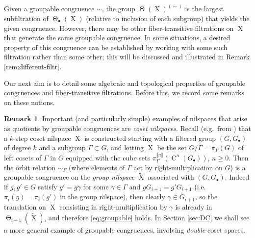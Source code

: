 \documentclass[a4paper,12pt,reqno]{amsart}
\theoremstyle{definition}
\newtheorem{remark}[theorem]{Remark}
\newcommand*{\db}[1]{\llbracket #1\rrbracket}
\newcommand{\wt}{\widetilde}
\DeclareMathOperator{\tran}{\Theta}
\DeclareMathOperator{\ns}{X}
\DeclareMathOperator{\cu}{C}
\begin{document}
Given a groupable congruence $\sim$, the group $\tran(\ns)^{(\sim)}$ is the largest subfiltration of $\tran_\bullet(\ns)$  (relative to inclusion of each subgroup) that yields the given congruence. However, there may be other fiber-transitive filtrations on $\ns$ that generate the same groupable congruence. In some situations, a desired property of this congruence can be established by working with some such filtration rather than some other; this will be discussed and illustrated in Remark \ref{rem:different-filtr}.

Our next aim is to detail some algebraic and topological properties of groupable congruences and fiber-transitive filtrations. Before this, we record some remarks on these notions.

\begin{remark}\label{rem:cosnilex}
Important (and particularly simple) examples of nilspaces that arise as quotients by groupable congruences are \emph{coset nilspaces}. Recall (e.g.\ from  \cite[Proposition 2.3.1]{Cand:Notes1}) that a $k$-step coset nilspace $\ns$ is constructed starting with a filtered group $(G,G_\bullet)$ of degree $k$ and a subgroup $\Gamma\subset G$, and letting $\ns$ be the set $G/\Gamma = \pi_\Gamma(G)$ of left cosets of $\Gamma$ in $G$ equipped with the cube sets $\pi_\Gamma^{\db{n}}(\cu^n(G_\bullet))$, $n\geq 0$. Then the orbit relation $\sim_\Gamma$ (where elements of $\Gamma$ act by right-multiplication on $G$) is a groupable congruence on the \emph{group nilspace}  $\wt{\ns}$ associated with $(G,G_\bullet)$. Indeed if $g,g'\in G$ satisfy $g'= g\gamma$ for some $\gamma\in \Gamma$ and $g G_{i+1} = g' G_{i+1}$ (i.e.\ $\pi_i(g)=\pi_i(g')$ in the group nilspace), then clearly $\gamma\in G_{i+1}$, so the translation on $\wt{\ns}$ consisting in right-multiplication by $\gamma$ is already in $\tran_{i+1}(\wt{\ns})$, and therefore \eqref{eq:groupable} holds. In Section \ref{sec:DC} we shall see a more general example of groupable congruences, involving \emph{double}-coset spaces.
\end{remark}
\end{document}
